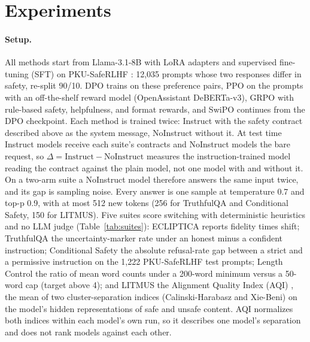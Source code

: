 \documentclass[letterpaper]{article} %
\begin{document}
\section{Experiments}
\label{sec:exp}

\paragraph{Setup.}
All methods start from Llama-3.1-8B \cite{dubey2024llama} with LoRA adapters and supervised fine-tuning (SFT) on PKU-SafeRLHF \cite{ji2024pku}: 12,035 prompts whose two responses differ in safety, re-split 90/10. DPO trains on these preference pairs, PPO \cite{schulman2017proximal} on the prompts with an off-the-shelf reward model (OpenAssistant DeBERTa-v3), GRPO \cite{shao2024deepseekmath} with rule-based safety, helpfulness, and format rewards, and SwiPO continues from the DPO checkpoint. Each method is trained twice: Instruct with the safety contract described above as the system message, NoInstruct without it. At test time Instruct models receive each suite's contracts and NoInstruct models the bare request, so $\Delta=\text{Instruct}-\text{NoInstruct}$ measures the instruction-trained model reading the contract against the plain model, not one model with and without it. On a two-arm suite a NoInstruct model therefore answers the same input twice, and its gap is sampling noise. Every answer is one sample at temperature 0.7 and top-p 0.9, with at most 512 new tokens (256 for TruthfulQA and Conditional Safety, 150 for LITMUS). Five suites score switching with deterministic heuristics and no LLM judge (Table~\ref{tab:suites}): ECLIPTICA reports fidelity times shift; TruthfulQA \cite{lin2022truthfulqa} the uncertainty-marker rate under an honest minus a confident instruction; Conditional Safety the absolute refusal-rate gap between a strict and a permissive instruction on the 1,222 PKU-SafeRLHF test prompts; Length Control the ratio of mean word counts under a 200-word minimum versus a 50-word cap (target above 4); and LITMUS the Alignment Quality Index (AQI) \cite{borah2025aqi}, the mean of two cluster-separation indices (Calinski-Harabasz and Xie-Beni) on the model's hidden representations of safe and unsafe content. AQI normalizes both indices within each model's own run, so it describes one model's separation and does not rank models against each other.
\end{document}
